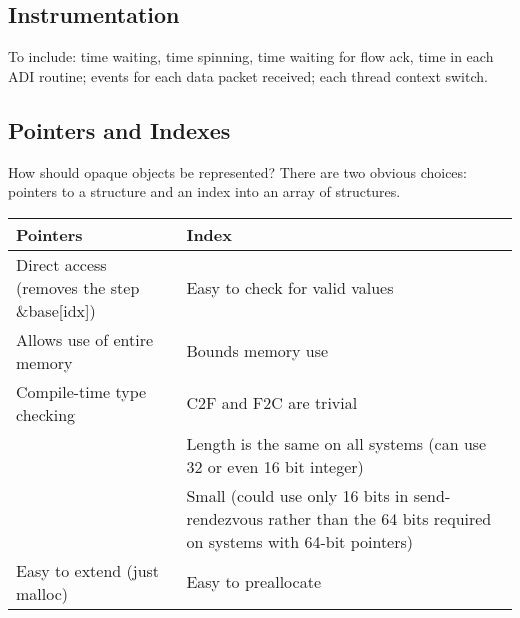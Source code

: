\documentclass{article}
\begin{document}
\subsection{Instrumentation}
To include: time waiting, time spinning, time waiting for flow ack, time in
each ADI routine; events for each data packet received; each thread context
switch. 

\subsection{Pointers and Indexes}
How should opaque objects be represented?  There are two obvious choices:
pointers to a structure and an index into an array of structures.  

\begin{center}
\begin{tabular}{p{2.5in}p{2.5in}}
Pointers&Index\\\hline
Direct access (removes the step \&base[idx])&Easy to check for valid values\\
Allows use of entire memory&Bounds memory use\\
Compile-time type checking&C2F and F2C are trivial\\
&Length is the same on all systems (can use 32 or even 16 bit integer)\\
&Small (could use only 16 bits in send-rendezvous rather than the 64 bits
required on systems with 64-bit pointers)\\
Easy to extend (just malloc)&Easy to preallocate\\
\end{tabular}
\end{center}



\end{document}
